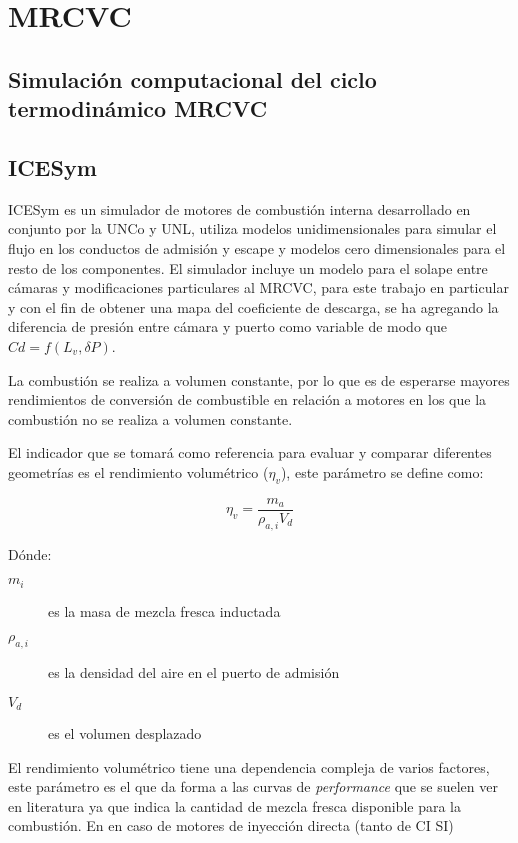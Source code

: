 \chapter{MRCVC}

\section{Simulación computacional del ciclo termodinámico MRCVC}

\section{ICESym}
%
ICESym \cite{icesym} es un simulador de motores de combustión interna
desarrollado en conjunto por la UNCo y UNL, utiliza modelos unidimensionales
para simular el flujo en los conductos de admisión y escape y modelos cero
dimensionales para el resto de los componentes.
%
El simulador incluye un modelo para el solape entre cámaras \cite{lopez16} y
modificaciones particulares al MRCVC, para este trabajo en particular  y con el
fin de obtener una mapa del coeficiente de descarga, se ha agregando la
diferencia de presión entre cámara y puerto como variable de modo que $Cd =
f(L_v, \delta P)$.

La combustión se realiza a volumen constante, por lo que es de esperarse
mayores rendimientos de conversión de combustible en relación a motores en los
que la combustión no se realiza a volumen constante.

El indicador que se tomará como referencia para evaluar y comparar diferentes
geometrías es el rendimiento volumétrico ($\eta_v$), este parámetro se define
como:

\begin{equation}
    \eta_v = \frac{m_a}{\rho_{a,i}V_d}
\end{equation}

Dónde:
%
\begin{description}
    \item[$m_i$] es la masa de mezcla fresca inductada
    \item[$\rho_{a,i}$] es la densidad del aire en el puerto de admisión
    \item[$V_d$] es el volumen desplazado
\end{description}

El rendimiento volumétrico tiene una dependencia compleja de varios factores,
este parámetro es el que da forma a las curvas de \emph{performance} que se
suelen ver en literatura ya que indica la cantidad de mezcla fresca disponible
para la combustión. 
%
En en caso de motores de inyección directa (tanto de CI SI)

